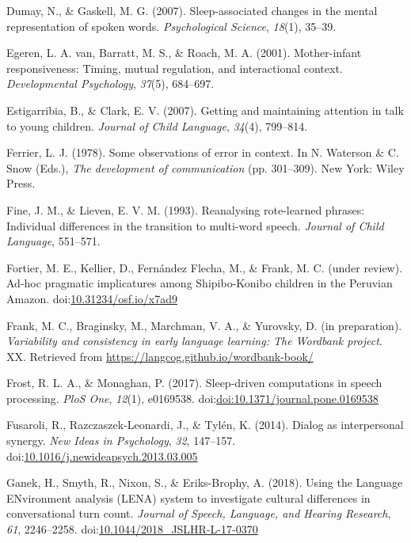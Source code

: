 \documentclass[floatsintext,man]{apa6}
\theoremstyle{definition}
\theoremstyle{definition}
\theoremstyle{definition}
\theoremstyle{remark}
\begin{document}
\hypertarget{ref-dumay2007sleep}{}
Dumay, N., \& Gaskell, M. G. (2007). Sleep-associated changes in the
mental representation of spoken words. \emph{Psychological Science},
\emph{18}(1), 35--39.

\hypertarget{ref-vanegeren2001mother}{}
Egeren, L. A. van, Barratt, M. S., \& Roach, M. A. (2001). Mother-infant
responsiveness: Timing, mutual regulation, and interactional context.
\emph{Developmental Psychology}, \emph{37}(5), 684--697.

\hypertarget{ref-estigarribia2007getting}{}
Estigarribia, B., \& Clark, E. V. (2007). Getting and maintaining
attention in talk to young children. \emph{Journal of Child Language},
\emph{34}(4), 799--814.

\hypertarget{ref-ferrier1978some}{}
Ferrier, L. J. (1978). Some observations of error in context. In N.
Waterson \& C. Snow (Eds.), \emph{The development of communication} (pp.
301--309). New York: Wiley Press.

\hypertarget{ref-pine1993reanalysing}{}
Fine, J. M., \& Lieven, E. V. M. (1993). Reanalysing rote-learned
phrases: Individual differences in the transition to multi-word speech.
\emph{Journal of Child Language}, 551--571.

\hypertarget{ref-fortierURadhoc}{}
Fortier, M. E., Kellier, D., Fernández Flecha, M., \& Frank, M. C.
(under review). Ad-hoc pragmatic implicatures among Shipibo-Konibo
children in the Peruvian Amazon.
doi:\href{https://doi.org/10.31234/osf.io/x7ad9}{10.31234/osf.io/x7ad9}

\hypertarget{ref-frankIPvariability}{}
Frank, M. C., Braginsky, M., Marchman, V. A., \& Yurovsky, D. (in
preparation). \emph{Variability and consistency in early language
learning: The Wordbank project}. XX. Retrieved from
\url{https://langcog.github.io/wordbank-book/}

\hypertarget{ref-frost2017sleep}{}
Frost, R. L. A., \& Monaghan, P. (2017). Sleep-driven computations in
speech processing. \emph{PloS One}, \emph{12}(1), e0169538.
doi:\href{https://doi.org/doi:10.1371/journal.pone.0169538}{doi:10.1371/journal.pone.0169538}

\hypertarget{ref-fusaroli2014synergy}{}
Fusaroli, R., Razczaszek-Leonardi, J., \& Tylén, K. (2014). Dialog as
interpersonal synergy. \emph{New Ideas in Psychology}, \emph{32},
147--157.
doi:\href{https://doi.org/10.1016/j.newideapsych.2013.03.005}{10.1016/j.newideapsych.2013.03.005}

\hypertarget{ref-ganek2018using}{}
Ganek, H., Smyth, R., Nixon, S., \& Eriks-Brophy, A. (2018). Using the
Language ENvironment analysis (LENA) system to investigate cultural
differences in conversational turn count. \emph{Journal of Speech,
Language, and Hearing Research}, \emph{61}, 2246--2258.
doi:\href{https://doi.org/10.1044/2018_JSLHR-L-17-0370}{10.1044/2018\_JSLHR-L-17-0370}
\end{document}
